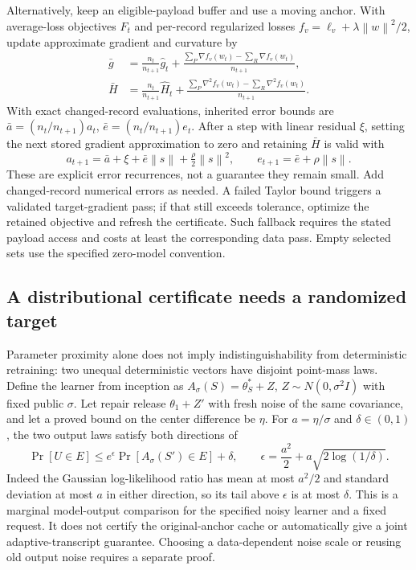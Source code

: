 \documentclass[11pt,a4paper]{article}
\theoremstyle{definition}\newtheorem{definition}[theorem]{Definition}
\newcommand{\norm}[1]{\left\lVert #1\right\rVert}
\begin{document}
Alternatively, keep an eligible-payload buffer and use a moving anchor. With average-loss objectives $F_t$ and per-record regularized losses $f_v=\ell_v+\lambda\norm w^2/2$, update approximate gradient and curvature by
\begin{align*}
 \bar g&=\frac{n_t}{n_{t+1}}\widehat g_t+
 \frac{\sum_{P}\nabla f_v(w_t)-\sum_R\nabla f_v(w_t)}{n_{t+1}},\\
 \bar H&=\frac{n_t}{n_{t+1}}\widehat H_t+
 \frac{\sum_{P}\nabla^2 f_v(w_t)-\sum_R\nabla^2 f_v(w_t)}{n_{t+1}}.
\end{align*}
With exact changed-record evaluations, inherited error bounds are $\bar a=(n_t/n_{t+1})a_t$, $\bar e=(n_t/n_{t+1})e_t$. After a step with linear residual $\xi$, setting the next stored gradient approximation to zero and retaining $\bar H$ is valid with
\[
 a_{t+1}=\bar a+\xi+\bar e\norm s+\tfrac\rho2\norm{s}^2,
 \qquad e_{t+1}=\bar e+\rho\norm s.
\]
These are explicit error recurrences, not a guarantee they remain small. Add changed-record numerical errors as needed. A failed Taylor bound triggers a validated target-gradient pass; if that still exceeds tolerance, optimize the retained objective and refresh the certificate. Such fallback requires the stated payload access and costs at least the corresponding data pass. Empty selected sets use the specified zero-model convention.

\subsection{A distributional certificate needs a randomized target}
Parameter proximity alone does not imply indistinguishability from deterministic retraining: two unequal deterministic vectors have disjoint point-mass laws. Define the learner from inception as
$A_\sigma(S)=\theta^*_S+Z$, $Z\sim N(0,\sigma^2I)$ with fixed public $\sigma$. Let repair release $\theta_1+Z'$ with fresh noise of the same covariance, and let a proved bound on the center difference be $\eta$. For $a=\eta/\sigma$ and $\delta\in(0,1)$, the two output laws satisfy both directions of
\begin{equation}
 \Pr[U\in E]\le e^\epsilon\Pr[A_\sigma(S')\in E]+\delta,
 \qquad \epsilon=\frac{a^2}{2}+a\sqrt{2\log(1/\delta)}.
\end{equation}
Indeed the Gaussian log-likelihood ratio has mean at most $a^2/2$ and standard deviation at most $a$ in either direction, so its tail above $\epsilon$ is at most $\delta$. This is a marginal model-output comparison for the specified noisy learner and a fixed request. It does not certify the original-anchor cache or automatically give a joint adaptive-transcript guarantee. Choosing a data-dependent noise scale or reusing old output noise requires a separate proof.
\end{document}
